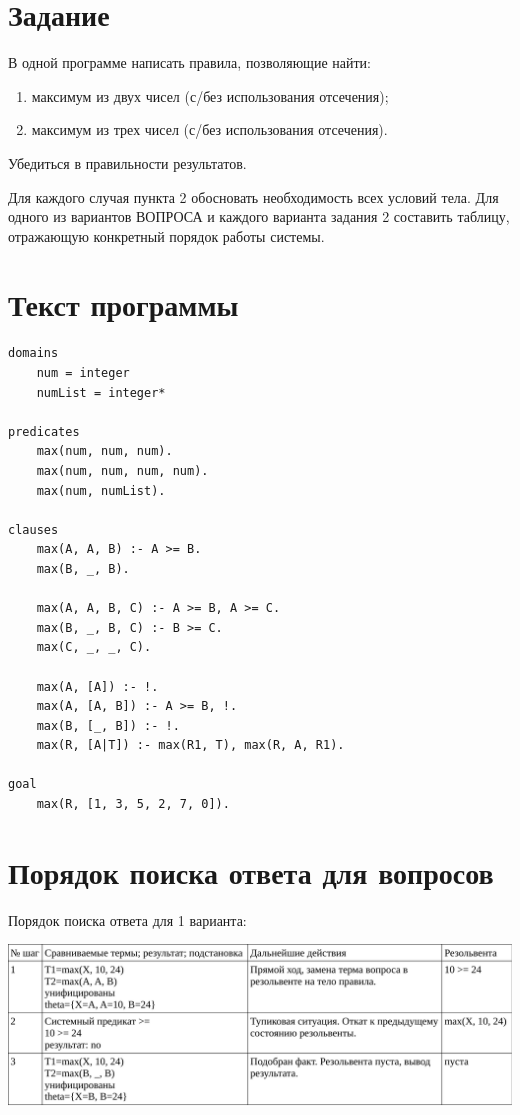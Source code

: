 {\large\section*{Задание}}

В одной программе написать правила, позволяющие найти:

\begin{enumerate}[1.]
	\item максимум из двух чисел (с/без использования отсечения);
	\item максимум из трех чисел (с/без использования отсечения).
\end{enumerate}

Убедиться в правильности результатов.

Для каждого случая пункта 2 обосновать необходимость всех условий тела. Для одного из вариантов ВОПРОСА и каждого варианта задания 2 составить таблицу, отражающую конкретный порядок работы системы.

\clearpage

{\large\section*{Текст программы}}

\begin{lstlisting}
domains
	num = integer
	numList = integer*

predicates
	max(num, num, num).
	max(num, num, num, num).
	max(num, numList).

clauses
	max(A, A, B) :- A >= B.
	max(B, _, B).
	
	max(A, A, B, C) :- A >= B, A >= C.
	max(B, _, B, C) :- B >= C.
	max(C, _, _, C).
	
	max(A, [A]) :- !.
	max(A, [A, B]) :- A >= B, !.
	max(B, [_, B]) :- !.
	max(R, [A|T]) :- max(R1, T), max(R, A, R1).

goal
	max(R, [1, 3, 5, 2, 7, 0]).
\end{lstlisting}

\clearpage

{\large\section*{Порядок поиска ответа для вопросов}}

Порядок поиска ответа для 1 варианта:

\vspace*{5mm}

\begin{center}
	\includegraphics[width=\linewidth]{table1.pdf}
\end{center}


